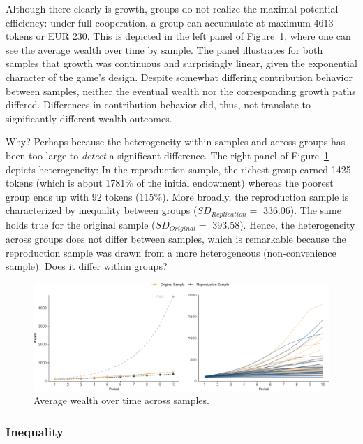 \documentclass[
  authoryear,
  review,
  3p,
  onecolumn]{elsarticle}
\begin{document}
Although there clearly is growth, groups do not realize the maximal
potential efficiency: under full cooperation, a group can accumulate at
maximum 4613 tokens or EUR 230. This is depicted in the left panel of
Figure~\ref{fig-growth-heterogeneity}, where one can see the average
wealth over time by sample. The panel illustrates for both samples that
growth was continuous and surprisingly linear, given the exponential
character of the game's design. Despite somewhat differing contribution
behavior between samples, neither the eventual wealth nor the
corresponding growth paths differed. Differences in contribution
behavior did, thus, not translate to significantly different wealth
outcomes.

Why? Perhaps because the heterogeneity within samples and across groups
has been too large to \emph{detect} a significant difference. The right
panel of Figure~\ref{fig-growth-heterogeneity} depicts heterogeneity: In
the reproduction sample, the richest group earned 1425 tokens (which is
about 1781\% of the initial endowment) whereas the poorest group ends up
with 92 tokens (115\%). More broadly, the reproduction sample is
characterized by inequality between groups (\(SD_{Replication} =\)
336.06). The same holds true for the original sample
(\(SD_{Original} =\) 393.58). Hence, the heterogeneity across groups
does not differ between samples, which is remarkable because the
reproduction sample was drawn from a more heterogeneous (non-convenience
sample). Does it differ within groups?

\begin{figure}

{\centering \includegraphics{paper_files/figure-pdf/fig-growth-heterogeneity-1.pdf}

}

\caption{\label{fig-growth-heterogeneity}Average wealth over time across
samples.}

\end{figure}

\hypertarget{sec-inequality}{%
\subsubsection{Inequality}\label{sec-inequality}}
\end{document}
